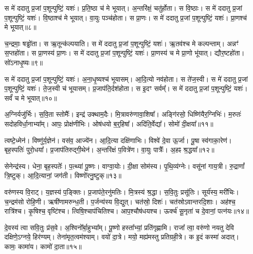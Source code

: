 स मे॑ ददातु प्र॒जां प॒शून्पुष्टिं॒ यशः॑। 
प्र॒ति॒ष्ठा च॑ मे भूयात्। 
अ॒न्तरि॑क्षं॒ चतु॑र्\mbox{}होता। 
स वि॒ष्ठाः। 
स मे॑ ददातु प्र॒जां प॒शून्पुष्टिं॒ यशः॑। 
वि॒ष्ठाश्च॑ मे भूयात्। 
वा॒युः पञ्च॑होता। 
स प्रा॒णः। 
स मे॑ ददातु प्र॒जां प॒शून्पुष्टिं॒ यशः॑। 
प्रा॒णश्च॑ मे भूयात्॥८॥

च॒न्द्रमाः॒ षड्ढो॑ता। 
स ऋ॒तून्क॑ल्पयाति। 
स मे॑ ददातु प्र॒जां प॒शून्पुष्टिं॒ यशः॑। 
ऋ॒तव॑श्च मे कल्पन्ताम्। 
अन्नꣳ॑ स॒प्तहो॑ता। 
स प्रा॒णस्य॑ प्रा॒णः। 
स मे॑ ददातु प्र॒जां प॒शून्पुष्टिं॒ यशः॑। 
प्रा॒णस्य॑ च मे प्रा॒णो भू॑यात्। 
द्यौर॒ष्टहो॑ता। 
सो॑ऽनाधृ॒ष्यः॥९॥

स मे॑ ददातु प्र॒जां प॒शून्पुष्टिं॒ यशः॑। 
अ॒ना॒धृ॒ष्यश्च॑ भूयासम्। 
आ॒दि॒त्यो नव॑होता। 
स ते॑ज॒स्वी। 
स मे॑ ददातु प्र॒जां प॒शून्पुष्टिं॒ यशः॑। 
ते॒ज॒स्वी च॑ भूयासम्। 
प्र॒जाप॑ति॒र्दश॑होता। 
स इ॒दꣳ सर्वम्᳚। 
स मे॑ ददातु प्र॒जां प॒शून्पुष्टिं॒ यशः॑। 
सर्वं॑ च मे भूयात्॥१०॥
\anuvakamend[प्र॒ति॒ष्ठा प्रा॒णश्च॑ मे भूयादनाधृ॒ष्यः सर्वं॑ च मे भूयात्]

अ॒ग्निर्यजु॑र्भिः। 
स॒वि॒ता स्तोमैः᳚। 
इन्द्र॑ उक्थाम॒दैः। 
मि॒त्रावरु॑णा\-वा॒शिषा᳚। 
अङ्गि॑रसो॒ धिष्णि॑यैर॒ग्निभिः॑। 
म॒रुतः॑ सदोहविर्धा॒नाभ्या᳚म्। 
आपः॒ प्रोक्ष॑णीभिः। 
ओष॑धयो ब॒र्॒‌हिषा᳚। 
अदि॑ति॒र्वेद्या᳚। 
सोमो॑ दी॒क्षया᳚॥११॥

त्वष्टे॒ध्मेन॑। 
विष्णु॑र्\mbox{}य॒ज्ञेन॑। 
वस॑व॒ आज्ये॑न। 
आ॒दि॒त्या दक्षि॑णाभिः। 
विश्वे॑ दे॒वा ऊ॒र्जा। 
पू॒षा स्व॑गाका॒रेण॑। 
बृह॒स्पतिः॑ पुरो॒धया᳚। 
प्र॒जाप॑तिरुद्गी॒थेन॑। 
अ॒न्तरि॑क्षं प॒वित्रे॑ण। 
वा॒युः पात्रैः᳚। 
अ॒हꣴ श्र॒द्धया᳚॥१२॥
\anuvakamend[दी॒क्षया॒ पात्रै॒रेकं॑ च]

सेनेन्द्र॑स्य। 
धेना॒ बृह॒स्पतेः᳚। 
प॒त्थ्या॑ पू॒ष्णः। 
वाग्वा॒योः। 
दी॒क्षा सोम॑स्य। 
पृ॒थि॒व्य॑ग्नेः। 
वसू॑नां  गाय॒त्री। 
रु॒द्राणां᳚ त्रि॒ष्टुक्। 
आ॒दि॒त्यानां॒ जग॑ती। 
विष्णो॑रनु॒ष्टुक्॥१३॥%

वरु॑णस्य वि॒राट्। 
य॒ज्ञस्य॑ प॒ङ्क्तिः। 
प्र॒जाप॑ते॒रनु॑मतिः। 
मि॒त्रस्य॑ श्र॒द्धा। 
स॒वि॒तुः प्रसू॑तिः। 
सूर्य॑स्य॒ मरी॑चिः। 
च॒न्द्रम॑सो रोहि॒णी। 
ऋषी॑णामरुन्ध॒ती। 
प॒र्जन्य॑स्य वि॒द्युत्। 
चत॑स्रो॒ दिशः॑। 
चत॑स्रोऽवान्तरदि॒शाः। 
अह॑श्च॒ रात्रि॑श्च। 
कृ॒षिश्च॒ वृष्टि॑श्च। 
त्विषि॒श्चा\-प॑\-चितिश्च। 
आप॒श्चौष॑धयश्च। 
ऊर्क्च॑ सू॒नृता॑ च दे॒वानां॒ पत्न॑यः॥१४॥%
\anuvakamend[अ॒नु॒ष्टुग्दिशः॒ षट्च॑]

दे॒वस्य॑ त्वा सवि॒तुः प्र॑स॒वे। 
अ॒श्विनो᳚र्बा॒हुभ्या᳚म्। 
पू॒ष्णो हस्ता᳚भ्यां॒ प्रति॑गृह्णामि। 
राजा᳚ त्वा॒ वरु॑णो नयतु देवि दक्षिणे॒ऽग्नये॒ हिर॑ण्यम्। 
तेना॑मृत॒त्वम॑श्याम्। 
वयो॑ दा॒त्रे। 
मयो॒ मह्य॑मस्तु प्रतिग्रही॒त्रे। 
क इ॒दं कस्मा॑ अदात्। 
कामः॒ कामा॑य। 
कामो॑ दा॒ता॥१५॥

